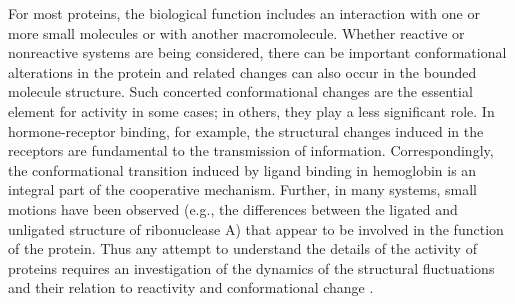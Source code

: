 For most proteins, the biological function includes an interaction with one or more small molecules or with another macromolecule. 
Whether reactive or nonreactive systems are being considered, there can be important conformational alterations in the protein and related changes can also occur in the bounded molecule structure. Such concerted conformational changes are the essential element for activity in some cases; in others, they play a less significant role.
In hormone-receptor binding, for example, the structural changes induced in the receptors are fundamental to the transmission of information. 
Correspondingly, the conformational transition induced by ligand binding in hemoglobin is an integral part of the cooperative mechanism.
Further, in many systems, small motions have been observed (e.g., the differences between the ligated and unligated structure of ribonuclease A) that appear to be involved in the function of the protein. 
Thus any attempt to understand the details of the activity of proteins requires an investigation of the dynamics of the structural fluctuations and their relation to reactivity and conformational change
\cite{brooks1988proteins}.


